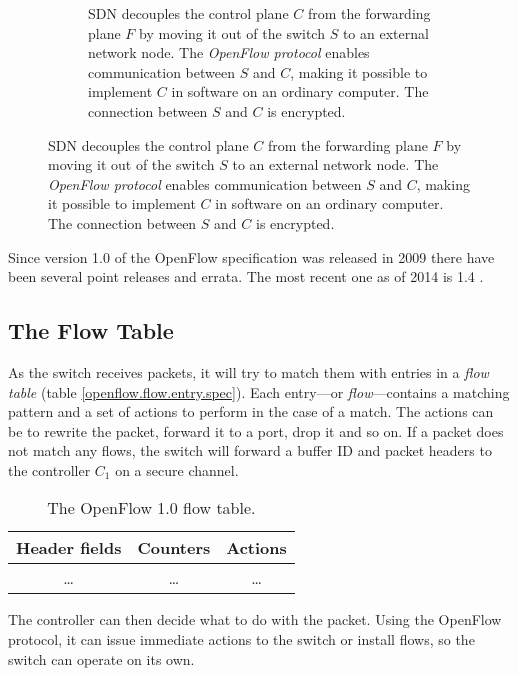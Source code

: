 \begin{figure}
\begin{subfigure}[t]{0.45\textwidth}
    \caption{\ac{SDN} decouples the control plane $C$ from the forwarding
      plane $F$ by moving it out of the switch $S$ to an external network
        node.  The \textit{OpenFlow protocol} enables communication between
        $S$ and $C$, making it possible to implement $C$ in software on an
        ordinary computer. The connection between $S$ and $C$ is encrypted.}
    \label{figure:decoupling.planes}
  \end{subfigure}
\end{figure}

Since version 1.0 of the OpenFlow specification was
released in 2009 there have been several point releases and errata.  The
most recent one as of 2014 is 1.4
\cite{openflow-1.0,openflow-1.0.1,openflow-1.0.2,openflow-1.1,openflow-1.2,openflow-1.3,openflow-1.4}.

\subsection{The Flow Table}

As the switch receives packets, it will try to match them with entries in a
\textit{flow table} (table \vref{openflow.flow.entry.spec}).
%
Each entry---or \textit{flow}---contains a matching pattern and a set of
actions to perform in the case of a match.  The actions can be to rewrite
the packet, forward it to a port, drop it and so on.
%
If a packet does not match any flows, the switch will forward a buffer ID
and packet headers to the controller $C_1$ on a secure channel.

\begin{table}[H]
  \centering
  \begin{tabular}{|c|c|c|}
    \hline \textbf{Header fields} &
           \textbf{Counters} &
           \textbf{Actions} \\
    \hline \dots & \dots & \dots \\
  \end{tabular}

  \caption{The OpenFlow 1.0 flow table.}
  \label{openflow.flow.entry.spec}
\end{table}

The controller can then decide what to do with the packet.  Using the
OpenFlow protocol, it can issue immediate actions to the switch or install
flows, so the switch can operate on its own.

